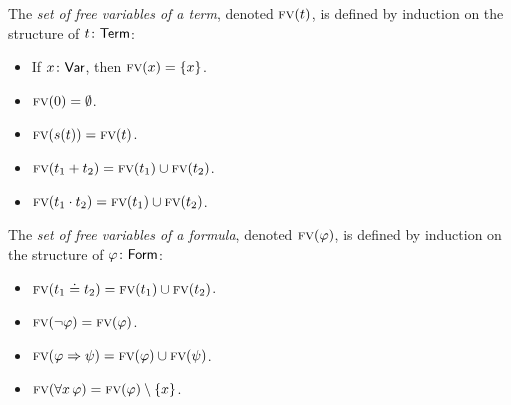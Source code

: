 \begin{defn}\label{defn:fv}
    The \textsl{set of free variables of a term}, denoted $\text{\scshape fv}(t)$, is defined by induction on the structure of $t\colon\fun{Term}$:
    \begin{itemize}
        \item If $x\colon\fun{Var}$, then $\text{\scshape fv}(x)=\{x\}$.
        \item $\text{\scshape fv}(0)=\emptyset$.
        \item $\text{\scshape fv}(s(t))=\text{\scshape fv}(t)$.
        \item $\text{\scshape fv}(t_1+t_2)=\text{\scshape fv}(t_1)\cup\text{\scshape fv}(t_2)$.
        \item $\text{\scshape fv}(t_1\cdot t_2)=\text{\scshape fv}(t_1)\cup\text{\scshape fv}(t_2)$.
    \end{itemize}
    
    The \textsl{set of free variables of a formula}, denoted $\text{\scshape fv}(\varphi)$, is defined by induction on the structure of $\varphi\colon\fun{Form}$:
    \begin{itemize}
        \item $\text{\scshape fv}(t_1\doteq t_2)=\text{\scshape fv}(t_1)\cup\text{\scshape fv}(t_2)$.
        \item $\text{\scshape fv}(\neg\varphi)=\text{\scshape fv}(\varphi)$.
        \item $\text{\scshape fv}(\varphi\mathrel{\Rightarrow}\psi)=\text{\scshape fv}(\varphi)\cup\text{\scshape fv}(\psi)$.
        \item $\text{\scshape fv}(\forall x\,\varphi)=\text{\scshape fv}(\varphi)\setminus\{x\}$.
    \end{itemize}
\end{defn}

